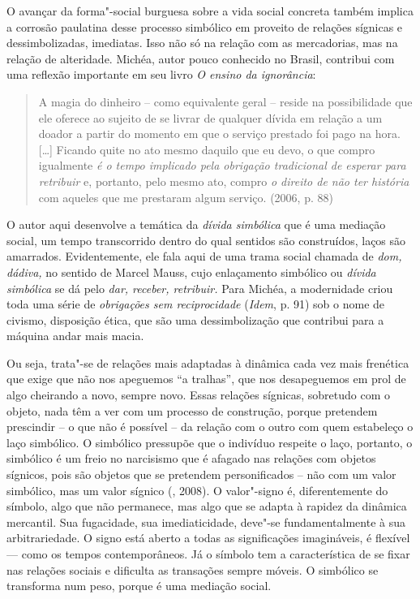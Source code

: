 O avançar da forma"-social burguesa sobre a vida social concreta também
implica a corrosão paulatina desse processo simbólico em proveito de
relações sígnicas e dessimbolizadas, imediatas. Isso não só na relação
com as mercadorias, mas na relação de alteridade. Michéa, autor pouco
conhecido no Brasil, contribui com uma reflexão importante em seu livro
\emph{O ensino da ignorância}:

\begin{quote}
A magia do dinheiro -- como equivalente geral -- reside na possibilidade
que ele oferece ao sujeito de se livrar de qualquer dívida em relação a
um doador a partir do momento em que o serviço prestado foi pago na
hora. [\ldots{}] Ficando quite no ato mesmo daquilo que eu devo, o
que compro igualmente \emph{é o tempo implicado pela obrigação
tradicional de esperar para retribuir} e, portanto, pelo mesmo ato,
compro \emph{o direito de não ter história} com aqueles que me prestaram
algum serviço. (2006, p. 88)
\end{quote}

O autor aqui desenvolve a temática da \emph{dívida simbólica} que é uma
mediação social, um tempo transcorrido dentro do qual sentidos são
construídos, laços são amarrados. Evidentemente, ele fala aqui de uma
trama social chamada de \emph{dom, dádiva,} no sentido de Marcel Mauss,
cujo enlaçamento simbólico ou \emph{dívida simbólica} se dá pelo
\emph{dar, receber, retribuir.} Para Michéa, a modernidade criou toda
uma série de \emph{obrigações sem reciprocidade} (\emph{Idem}, p. 91)
sob o nome de civismo, disposição ética, que são uma dessimbolização que
contribui para a máquina andar mais macia.

Ou seja, trata"-se de relações mais adaptadas à dinâmica cada vez mais
frenética que exige que não nos apeguemos ``a tralhas'', que nos
desapeguemos em prol de algo cheirando a novo, sempre novo. Essas
relações sígnicas, sobretudo com o objeto, nada têm a ver com um
processo de construção, porque pretendem prescindir -- o que não é
possível -- da relação com o outro com quem estabeleço o laço simbólico.
O simbólico pressupõe que o indivíduo respeite o laço, portanto, o
simbólico é um freio no narcisismo que é afagado nas relações com
objetos sígnicos, pois são objetos que se pretendem personificados --
não com um valor simbólico, mas um valor sígnico (, 2008). O
valor"-signo é, diferentemente do símbolo, algo que não permanece, mas
algo que se adapta à rapidez da dinâmica mercantil. Sua fugacidade, sua
imediaticidade, deve"-se fundamentalmente à sua arbitrariedade. O signo
está aberto a todas as significações imagináveis, é flexível --- como os
tempos contemporâneos. Já o símbolo tem a característica de se fixar nas
relações sociais e dificulta as transações sempre móveis. O simbólico se
transforma num peso, porque é uma mediação social.

